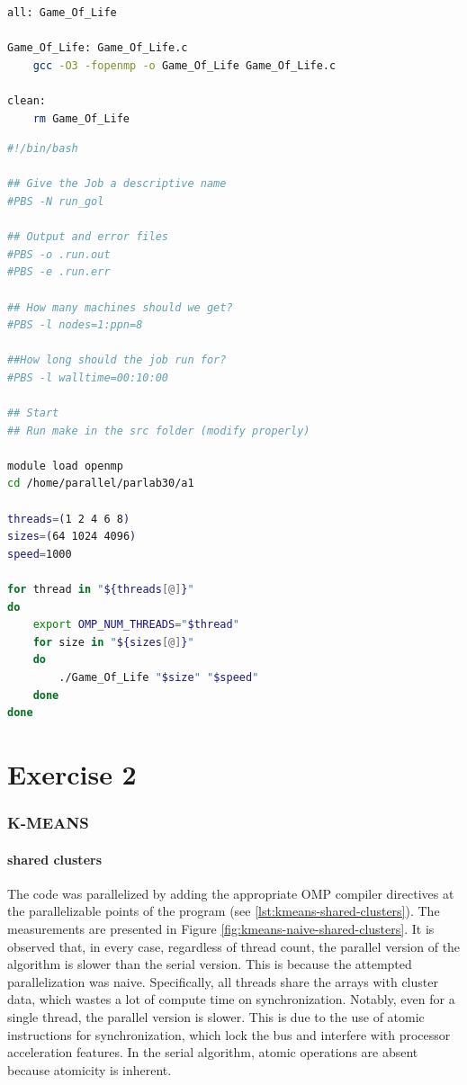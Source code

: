\documentclass{article}
\newcommand{\eng}[1]{#1}
\begin{document}
\begin{lstlisting}[caption={Makefile}, language=bash, label={lst:makefile}]
all: Game_Of_Life

Game_Of_Life: Game_Of_Life.c
	gcc -O3 -fopenmp -o Game_Of_Life Game_Of_Life.c

clean:
	rm Game_Of_Life
\end{lstlisting}

\clearpage
\begin{lstlisting}[caption={Bash Script to Gather Measurements}, language=bash, label={lst:run-gol}]
#!/bin/bash

## Give the Job a descriptive name
#PBS -N run_gol

## Output and error files
#PBS -o .run.out
#PBS -e .run.err

## How many machines should we get? 
#PBS -l nodes=1:ppn=8

##How long should the job run for?
#PBS -l walltime=00:10:00

## Start 
## Run make in the src folder (modify properly)

module load openmp
cd /home/parallel/parlab30/a1

threads=(1 2 4 6 8)
sizes=(64 1024 4096)
speed=1000

for thread in "${threads[@]}"
do
    export OMP_NUM_THREADS="$thread"
    for size in "${sizes[@]}"
    do
        ./Game_Of_Life "$size" "$speed"
    done
done
\end{lstlisting}

\clearpage
\part{Exercise 2}

\section{\eng{K-MEANS}}

\subsection{\eng{shared clusters}}

The code was parallelized by adding the appropriate \eng{OMP compiler directives} at the parallelizable points of the program (see \ref{lst:kmeans-shared-clusters}). The measurements are presented in Figure \ref{fig:kmeans-naive-shared-clusters}. It is observed that, in every case, regardless of thread count, the parallel version of the algorithm is slower than the serial version. This is because the attempted parallelization was naive. Specifically, all threads share the arrays with cluster data, which wastes a lot of compute time on synchronization. Notably, even for a single thread, the parallel version is slower. This is due to the use of atomic instructions for synchronization, which lock the bus and interfere with processor acceleration features. In the serial algorithm, atomic operations are absent because atomicity is inherent.
\end{document}
